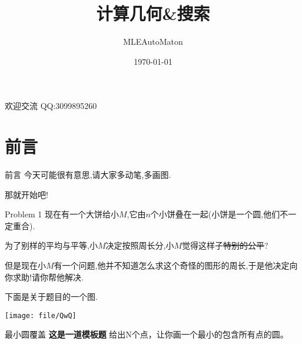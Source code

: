\documentclass[mathserif]{beamer} %
\title{计算几何\&搜索}
\author{MLEAutoMaton}
\institute{长郡中学}
\date{\today}
\begin{document}
	\begin{frame}
	\titlepage
	\begin{center}
		{\tiny 欢迎交流 QQ:3099895260}
	\end{center}
\end{frame}
\section{前言}
\begin{frame}{前言}
今天可能很有意思,请大家多动笔,多画图.\pause\newline

那就开始吧!
\end{frame}
\begin{frame}{Problem 1}
现在有一个大饼给小$M$,它由$n$个小饼叠在一起(小饼是一个圆,他们不一定重合).

为了别样的平均与平等,小$M$决定按照周长分,小$M$觉得这样子\sout{特别的公平}?

但是现在小$M$有一个问题,他并不知道怎么求这个奇怪的图形的周长,于是他决定向你求助!请你帮他解决.

下面是关于题目的一个图.\newline

\texttt{[image: file/QwQ]}

\end{frame}
\begin{frame}{最小圆覆盖}
\textbf{这是一道模板题}\newline \pause
给出N个点，让你画一个最小的包含所有点的圆。

\end{frame}
\end{document}
